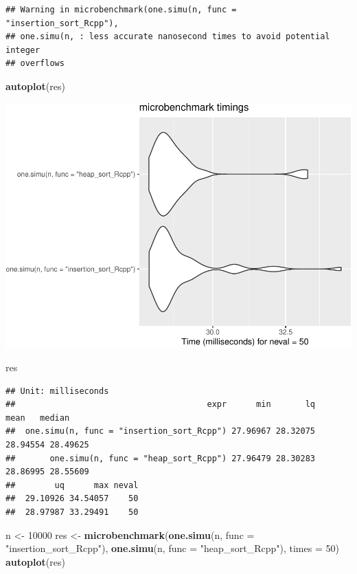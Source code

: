 \documentclass[
]{article}
\newenvironment{Shaded}{\begin{snugshade}}{\end{snugshade}}
\newcommand{\AttributeTok}[1]{\textcolor[rgb]{0.13,0.29,0.53}{#1}}
\newcommand{\DecValTok}[1]{\textcolor[rgb]{0.00,0.00,0.81}{#1}}
\newcommand{\FunctionTok}[1]{\textcolor[rgb]{0.13,0.29,0.53}{\textbf{#1}}}
\newcommand{\NormalTok}[1]{#1}
\newcommand{\OtherTok}[1]{\textcolor[rgb]{0.56,0.35,0.01}{#1}}
\newcommand{\StringTok}[1]{\textcolor[rgb]{0.31,0.60,0.02}{#1}}
\begin{document}
\begin{verbatim}
## Warning in microbenchmark(one.simu(n, func = "insertion_sort_Rcpp"),
## one.simu(n, : less accurate nanosecond times to avoid potential integer
## overflows
\end{verbatim}

\begin{Shaded}
\begin{Highlighting}[]
\FunctionTok{autoplot}\NormalTok{(res)}
\end{Highlighting}
\end{Shaded}

\includegraphics{1_Sorting_analyse_files/figure-latex/unnamed-chunk-11-1.pdf}

\begin{Shaded}
\begin{Highlighting}[]
\NormalTok{res}
\end{Highlighting}
\end{Shaded}

\begin{verbatim}
## Unit: milliseconds
##                                       expr      min       lq     mean   median
##  one.simu(n, func = "insertion_sort_Rcpp") 27.96967 28.32075 28.94554 28.49625
##       one.simu(n, func = "heap_sort_Rcpp") 27.96479 28.30283 28.86995 28.55609
##        uq      max neval
##  29.10926 34.54057    50
##  28.97987 33.29491    50
\end{verbatim}

\begin{Shaded}
\begin{Highlighting}[]
\NormalTok{n }\OtherTok{\textless{}{-}} \DecValTok{10000}
\NormalTok{res }\OtherTok{\textless{}{-}} \FunctionTok{microbenchmark}\NormalTok{(}\FunctionTok{one.simu}\NormalTok{(n, }\AttributeTok{func =} \StringTok{"insertion\_sort\_Rcpp"}\NormalTok{), }\FunctionTok{one.simu}\NormalTok{(n, }\AttributeTok{func =} \StringTok{"heap\_sort\_Rcpp"}\NormalTok{), }\AttributeTok{times =} \DecValTok{50}\NormalTok{)}
\FunctionTok{autoplot}\NormalTok{(res)}
\end{Highlighting}
\end{Shaded}
\end{document}
